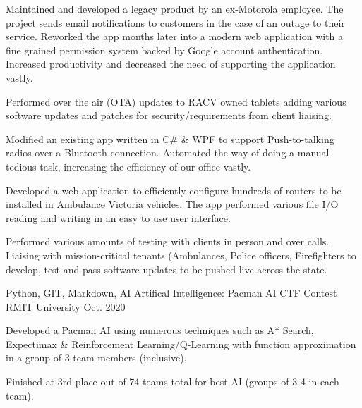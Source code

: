\begin{cventries}
{\begin{cvitems}
		\item {Maintained and developed a legacy product by an ex-Motorola employee. The project sends email notifications to customers in the case of an outage to their service. Reworked the app months later into a modern web application with a fine grained permission system backed by Google account authentication. Increased productivity and decreased the need of supporting the application vastly.}
        \item {Performed over the air (OTA) updates to RACV owned tablets adding various software updates and patches for security/requirements from client liaising.}
		\item {Modified an existing app written in C\# \& WPF to support Push-to-talking radios over a Bluetooth connection. Automated the way of doing a manual tedious task, increasing the efficiency of our office vastly.}
        \item {Developed a web application to efficiently configure hundreds of routers to be installed in Ambulance Victoria vehicles. The app performed various file I/O reading and writing in an easy to use user interface.}
        \item {Performed various amounts of testing with clients in person and over calls. Liaising with mission-critical tenants (Ambulances, Police officers, Firefighters} to develop, test and pass software updates to be pushed live across the state.
      \end{cvitems}
    }
  \cventry
    {Python, GIT, Markdown, AI}
    {Artifical Intelligence: Pacman AI CTF Contest}
    {RMIT University}
    {Oct. 2020}
    {
      \begin{cvitems}
        \item {Developed a Pacman AI using numerous techniques such as A* Search, Expectimax \& Reinforcement Learning/Q-Learning with function approximation in a group of 3 team members (inclusive).}
        \item {Finished at 3rd place out of 74 teams total for best AI (groups of 3-4 in each team).}
      \end{cvitems}
    }
\end{cventries}
